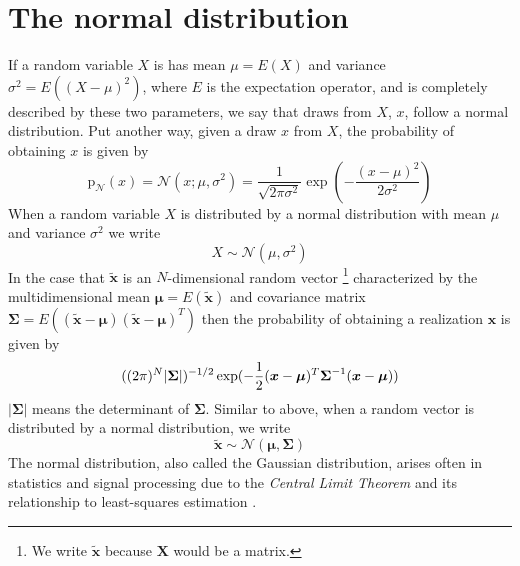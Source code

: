 \chapter{The normal distribution\label{chap:normaldist}}

If a random variable $X$ is has mean $\mu = E(X)$ and variance $\sigma^{2} =
E((X-\mu)^{2})$, where $E$ is the expectation operator, and is completely
described by these two parameters, we say that draws from $X$, $x$, follow a
normal distribution. Put another way, given a draw $x$ from $X$, the probability of
obtaining $x$ is given by
\[
    \mathrm{p}_{\mathcal{N}}(x)
    =
    \mathcal{N}(x;\mu,\sigma^{2})
    =
    \frac{1}{\sqrt{2\pi\sigma^{2}}}\exp(-\frac{(x-\mu)^{2}}{2\sigma^{2}})
\]
When a random variable $X$ is distributed by a normal distribution with mean $\mu$
and variance $\sigma^{2}$ we write
\[
    X \sim \mathcal{N}(\mu,\sigma^{2})
\]
In the case that $\boldsymbol{\tilde{x}}$ is an $N$-dimensional random vector%
\footnote{We write $\boldsymbol{\tilde{x}}$ because $\boldsymbol{X}$ would be a
matrix.} characterized by
the multidimensional mean $\boldsymbol{\mu} = E(\boldsymbol{\tilde{x}})$ and
covariance matrix
$\boldsymbol{\Sigma} =
E((\boldsymbol{\tilde{x}}-\boldsymbol{\mu})(\boldsymbol{\tilde{x}}-\boldsymbol{\mu})^{T})$
then the probability of obtaining a realization $\boldsymbol{x}$ is given by
\[
    ((2\pi)^{N}|\boldsymbol{\Sigma}|)^{-1/2}%
    \exp(\D-\frac{1}{2}(\boldsymbol{x}-\boldsymbol{\mu})^{T}%
    \boldsymbol{\Sigma}^{-1}(\boldsymbol{x}-\boldsymbol{\mu}))
\]
$|\boldsymbol{\Sigma}|$ means the determinant of $\boldsymbol{\Sigma}$. Similar
to above, when a random vector is distributed by a normal distribution, we write
\[
    \boldsymbol{\tilde{x}} \sim \mathcal{N}(\boldsymbol{\mu},\boldsymbol{\Sigma})
\]
The normal distribution, also called the Gaussian distribution, arises
often in statistics and signal processing due to the \textit{Central Limit
Theorem} \cite{feller2008introduction} and its relationship to least-squares
estimation \cite{kay1993fundamentals}.
